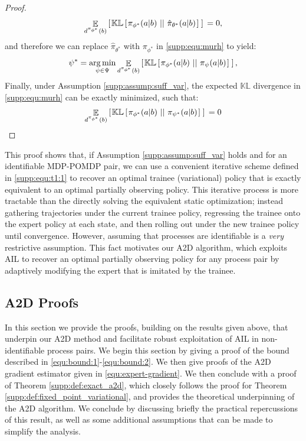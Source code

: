 \begin{proof}
\begin{align}
    \mathop{\mathbb{E}}_{d^{\pi_{\phi^*}}(b)}  \left[ \hspace*{0.1em}{}  \mathbb{KL} \left[ \hspace*{0.1em}{}  \pi_{\phi^*}(a|b) \ ||\ {} \hat{\pi}_{\theta^*}(a|b)  \hspace*{0.1em} \right]{}  \hspace*{0.1em} \right]{}  = 0,  
\end{align}
and therefore we can replace $\hat{\pi}_{\theta^*}$ with $\pi_{\phi^*}$ in \eqref{supp:equ:murh} to yield:
\begin{align}
    \psi^* = \mathop{\operatorname{arg\,min}}_{\psi \in \Psi}  \mathop{\mathbb{E}}_{d^{\pi_{\phi^*}}(b)}  \left[ \hspace*{0.1em}{}  \mathbb{KL} \left[ \hspace*{0.1em}{}  \pi_{\phi^*}(a|b) \ ||\ {} \pi_{\psi}(a|b) \hspace*{0.1em} \right]{}  \hspace*{0.1em} \right]{} , 
\end{align}
Finally, under Assumption \ref{supp:assump:suff_var}, the expected $\mathbb{KL}$ divergence in \eqref{supp:equ:murh} can be exactly minimized, such that:
\begin{equation}
    \mathop{\mathbb{E}}_{d^{\pi_{\phi^*}}(b)}  \left[ \hspace*{0.1em}{}  \mathbb{KL} \left[ \hspace*{0.1em}{}  \pi_{\phi^*}(a|b) \ ||\ {} \pi_{\psi^*}(a|b) \hspace*{0.1em} \right]{}  \hspace*{0.1em} \right]{}  = 0
\end{equation}
\end{proof}

This proof shows that, if Assumption \ref{supp:assump:suff_var} holds and for an identifiable MDP-POMDP pair, we can use a convenient iterative scheme defined in \eqref{supp:equ:t1:1} to recover an optimal trainee (variational) policy that is exactly equivalent to an optimal partially observing policy.  This iterative process is more tractable than the directly solving the equivalent static optimization; instead gathering trajectories under the current trainee policy, regressing the trainee onto the expert policy at each state, and then rolling out under the new trainee policy until convergence.  However, assuming that processes are identifiable is a \emph{very} restrictive assumption.  This fact motivates our A2D algorithm, which exploits AIL to recover an optimal partially observing policy for any process pair by adaptively modifying the expert that is imitated by the trainee.





\subsection{A2D Proofs}\label{supp:sec:a2d}
In this section we provide the proofs, building on the results given above, that underpin our A2D method and facilitate robust exploitation of AIL in non-identifiable process pairs.  We begin this section by giving a proof of the bound described in \eqref{equ:bound:1}-\eqref{equ:bound:2}.  We then give proofs of the A2D gradient estimator given in \eqref{equ:expert-gradient}.  We then conclude with a proof of Theorem \ref{supp:def:exact_a2d}, which closely follows the proof for Theorem \ref{supp:def:fixed_point_variational}, and provides the theoretical underpinning of the A2D algorithm.  We conclude by discussing briefly the practical repercussions of this result, as well as some additional assumptions that can be made to simplify the analysis. 


